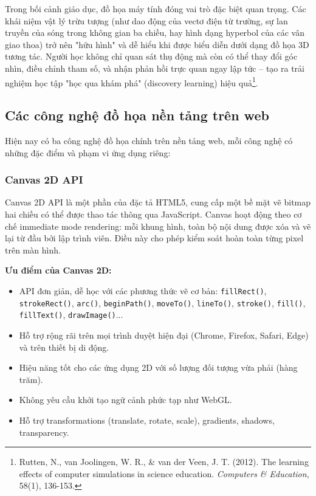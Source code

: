 Trong bối cảnh giáo dục, đồ họa máy tính đóng vai trò đặc biệt quan trọng. Các khái niệm vật lý trừu tượng (như dao động của vectơ điện từ trường, sự lan truyền của sóng trong không gian ba chiều, hay hình dạng hyperbol của các vân giao thoa) trở nên "hữu hình" và dễ hiểu khi được biểu diễn dưới dạng đồ họa 3D tương tác. Người học không chỉ quan sát thụ động mà còn có thể thay đổi góc nhìn, điều chỉnh tham số, và nhận phản hồi trực quan ngay lập tức – tạo ra trải nghiệm học tập "học qua khám phá" (discovery learning) hiệu quả\footnote{Rutten, N., van Joolingen, W. R., \& van der Veen, J. T. (2012). The learning effects of computer simulations in science education. \textit{Computers \& Education}, 58(1), 136-153.}.

\subsection{Các công nghệ đồ họa nền tảng trên web}

Hiện nay có ba công nghệ đồ họa chính trên nền tảng web, mỗi công nghệ có những đặc điểm và phạm vi ứng dụng riêng:

\subsubsection{Canvas 2D API}

Canvas 2D API là một phần của đặc tả HTML5, cung cấp một bề mặt vẽ bitmap hai chiều có thể được thao tác thông qua JavaScript. Canvas hoạt động theo cơ chế immediate mode rendering: mỗi khung hình, toàn bộ nội dung được xóa và vẽ lại từ đầu bởi lập trình viên. Điều này cho phép kiểm soát hoàn toàn từng pixel trên màn hình.

\textbf{Ưu điểm của Canvas 2D:}
\begin{itemize}
    \item API đơn giản, dễ học với các phương thức vẽ cơ bản: \texttt{fillRect()}, \texttt{strokeRect()}, \texttt{arc()}, \texttt{beginPath()}, \texttt{moveTo()}, \texttt{lineTo()}, \texttt{stroke()}, \texttt{fill()}, \texttt{fillText()}, \texttt{drawImage()}...
    \item Hỗ trợ rộng rãi trên mọi trình duyệt hiện đại (Chrome, Firefox, Safari, Edge) và trên thiết bị di động.
    \item Hiệu năng tốt cho các ứng dụng 2D với số lượng đối tượng vừa phải (hàng trăm).
    \item Không yêu cầu khởi tạo ngữ cảnh phức tạp như WebGL.
    \item Hỗ trợ transformations (translate, rotate, scale), gradients, shadows, transparency.
\end{itemize}

